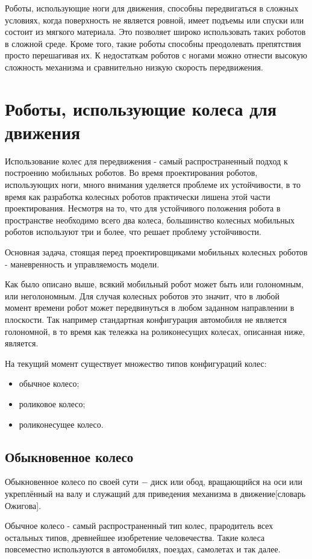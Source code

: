 \documentclass[oneside,final,14pt]{extreport}
\begin{document}
Роботы, использующие ноги для движения, способны передвигаться в сложных условиях, когда поверхность не является ровной, имеет подъемы или спуски или состоит из мягкого материала. Это позволяет широко использовать таких роботов в сложной среде. Кроме того, такие роботы способны преодолевать препятствия просто перешагивая их. К недостаткам роботов с ногами можно отнести высокую сложность механизма и сравнительно низкую скорость передвижения.
\section{Роботы, использующие колеса для движения}
Использование колес для передвижения - самый распространенный подход к построению мобильных роботов. Во время проектирования роботов, использующих ноги, много внимания уделяется проблеме их устойчивости, в то время как разработка колесных роботов практически лишена этой части проектирования. Несмотря на то, что для устойчивого положения робота в пространстве необходимо всего два колеса, большинство колесных мобильных роботов используют три и более, что решает проблему устойчивости.

Основная задача, стоящая перед проектировщиками мобильных колесных роботов - маневренность и управляемость модели.

Как было описано выше, всякий мобильный робот может быть или голономным, или неголономным. Для случая колесных роботов это значит, что в любой момент времени робот может передвинуться в любом заданном направлении в плоскости. Так например стандартная конфигурация автомобиля не является голономной, в то время как тележка на роликонесущих колесах, описанная ниже, является.

На текущий момент существует множество типов конфигураций колес:
\begin{itemize}
\item обычное колесо;
\item роликовое колесо;
\item роликонесущее колесо.
\end{itemize}
\subsection{Обыкновенное колесо}
Обыкновенное колесо по своей сути $-$ диск или обод, вращающийся на оси или укреплённый на валу и служащий для приведения механизма в движение[словарь Ожигова].

Обычное колесо - самый распространенный тип колес, прародитель всех остальных типов, древнейшее изобретение человечества. Такие колеса повсеместно используются в автомобилях, поездах, самолетах и так далее. 
\end{document}
